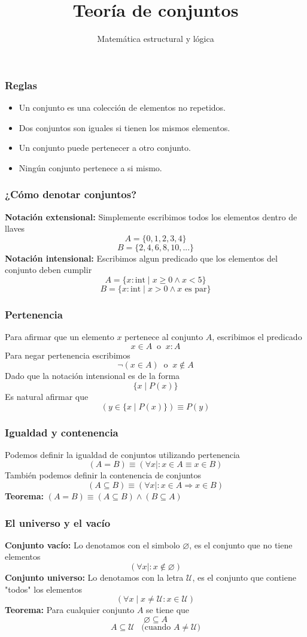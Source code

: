 \documentclass{beamer}
\title{Teoría de conjuntos}
\author{Matemática estructural y lógica}
\institute{ISIS-1104}
\date{}
\newcommand{\then}{\Rightarrow}
\begin{document}
\frame{\titlepage}

\begin{frame}[fragile]
    \frametitle{Reglas}
    \begin{itemize}
        \item Un conjunto es una colección de elementos no repetidos.
        \item Dos conjuntos son iguales si tienen los mismos elementos.
        \item Un conjunto puede pertenecer a otro conjunto.
        \item Ningún conjunto pertenece a si mismo.
    \end{itemize}
\end{frame}

\begin{frame}[fragile]
    \frametitle{¿Cómo denotar conjuntos?}
    \textbf{Notación extensional:} Simplemente escribimos todos los elementos dentro de
    llaves
    $$A = \{0, 1, 2, 3, 4\}$$
    $$B = \{2, 4, 6, 8, 10, ...\}$$
    \textbf{Notación intensional:} Escribimos algun predicado que los elementos del conjunto deben cumplir
    $$A = \{x:\text{int} \mid x \geq 0 \land x < 5 \}$$
    $$B = \{x:\text{int} \mid x > 0 \land x \text{ es par}\}$$    
\end{frame}

\begin{frame}[fragile]
    \frametitle{Pertenencia}
    Para afirmar que un elemento $x$ pertenece al conjunto $A$, escribimos el predicado
    $$x \in A\ \text{ o }\ x : A$$
    Para negar pertenencia escribimos 
    $$\lnot (x \in A)\ \text{ o }\ x \not \in A$$
    Dado que la notación intensional es de la forma
    $$\{x \mid P(x)\}$$
    Es natural afirmar que
    $$(y \in \{x \mid P(x)\}) \equiv P(y)$$
\end{frame}

\begin{frame}[fragile]
    \frametitle{Igualdad y contenencia}
    Podemos definir la igualdad de conjuntos utilizando pertenencia 
    $$(A = B) \equiv (\forall x \mid : x \in A \equiv x \in B)$$
    También podemos definir la contenencia de conjuntos
    $$(A \subseteq B) \equiv (\forall x \mid : x \in A \then x \in B)$$
    \textbf{Teorema:} $(A = B) \equiv (A \subseteq B) \land (B \subseteq A)$
\end{frame}

\begin{frame}[fragile]
    \frametitle{El universo y el vacío}
    \textbf{Conjunto vacío:} Lo denotamos con el simbolo $\varnothing$, es el conjunto que no tiene elementos
    $$(\forall x \mid : x \not \in \varnothing)$$
    \textbf{Conjunto universo:} Lo denotamos con la letra $\mathcal{U}$, es el conjunto que contiene "todos" los elementos
    $$(\forall x \mid x \neq \mathcal{U}: x \in \mathcal{U})$$
    \textbf{Teorema:} Para cualquier conjunto $A$ se tiene que
    $$\varnothing \subseteq A$$
    $$A \subseteq \mathcal{U} \hspace{10pt} \text{(cuando $A \neq \mathcal{U}$)}$$
\end{frame}
\end{document}
